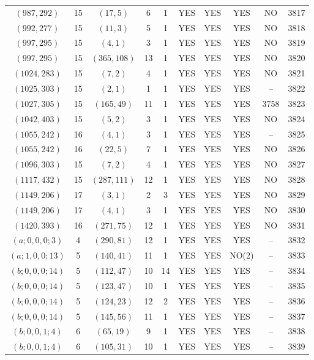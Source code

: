 \begin{longtable}{|c|c|c|c|c|c|c|c|c|c|}
$(987, 292)$ & 15 & $(17, 5)$ & 6 & 1 & YES & YES & YES & NO & 3817\\
$(992, 277)$ & 15 & $(11, 3)$ & 5 & 1 & YES & YES & YES & NO & 3818\\
$(997, 295)$ & 15 & $(4, 1)$ & 3 & 1 & YES & YES & YES & NO & 3819\\
$(997, 295)$ & 15 & $(365, 108)$ & 13 & 1 & YES & YES & YES & NO & 3820\\
$(1024, 283)$ & 15 & $(7, 2)$ & 4 & 1 & YES & YES & YES & NO & 3821\\
$(1025, 303)$ & 15 & $(2, 1)$ & 1 & 1 & YES & YES & YES & -- & 3822\\
$(1027, 305)$ & 15 & $(165, 49)$ & 11 & 1 & YES & YES & YES & 3758 & 3823\\
$(1042, 403)$ & 15 & $(5, 2)$ & 3 & 1 & YES & YES & YES & NO & 3824\\
$(1055, 242)$ & 16 & $(4, 1)$ & 3 & 1 & YES & YES & YES & -- & 3825\\
$(1055, 242)$ & 16 & $(22, 5)$ & 7 & 1 & YES & YES & YES & NO & 3826\\
$(1096, 303)$ & 15 & $(7, 2)$ & 4 & 1 & YES & YES & YES & NO & 3827\\
$(1117, 432)$ & 15 & $(287, 111)$ & 12 & 1 & YES & YES & YES & NO & 3828\\
$(1149, 206)$ & 17 & $(3, 1)$ & 2 & 3 & YES & YES & YES & NO & 3829\\
$(1149, 206)$ & 17 & $(4, 1)$ & 3 & 1 & YES & YES & YES & NO & 3830\\
$(1420, 393)$ & 16 & $(271, 75)$ & 12 & 1 & YES & YES & YES & NO & 3831\\
$(a; 0, 0, 0; 3)$ & 4 & $(290, 81)$ & 12 & 1 & YES & YES & YES & -- & 3832\\
$(a; 1, 0, 0; 13)$ & 5 & $(140, 41)$ & 11 & 1 & YES & YES & NO(2) & -- & 3833\\
$(b; 0, 0, 0; 14)$ & 5 & $(112, 47)$ & 10 & 14 & YES & YES & YES & -- & 3834\\
$(b; 0, 0, 0; 14)$ & 5 & $(123, 47)$ & 10 & 1 & YES & YES & YES & -- & 3835\\
$(b; 0, 0, 0; 14)$ & 5 & $(124, 23)$ & 12 & 2 & YES & YES & YES & -- & 3836\\
$(b; 0, 0, 0; 14)$ & 5 & $(145, 56)$ & 11 & 1 & YES & YES & YES & -- & 3837\\
$(b; 0, 0, 1; 4)$ & 6 & $(65, 19)$ & 9 & 1 & YES & YES & YES & -- & 3838\\
$(b; 0, 0, 1; 4)$ & 6 & $(105, 31)$ & 10 & 1 & YES & YES & YES & -- & 3839\\

\end{longtable}
